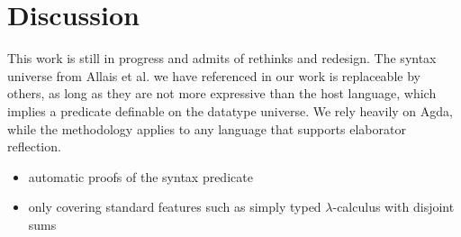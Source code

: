 \documentclass[sigplan,review,fleqn]{acmart}
\renewcommand{\verb}{\collectverb{\color{AgdaFunction}}}
\newcommand{\con}{\collectverb{\color{AgdaInductiveConstructor}}}
\begin{document}
%


\section{Discussion}
\label{sec:discussion}

This work is still in progress and admits of rethinks and redesign.
The syntax universe from Allais et al. we have referenced in our work is replaceable by others, as long as they are not more expressive than the host language, which implies a predicate definable on the datatype universe.
We rely heavily on Agda, while the methodology applies to any language that supports elaborator reflection.

\begin{itemize}
\item automatic proofs of the syntax predicate
\item only covering standard features such as simply typed $\lambda$-calculus with disjoint sums~\citep{Abel-POPLMark-reloaded}
\end{itemize}
\end{document}
